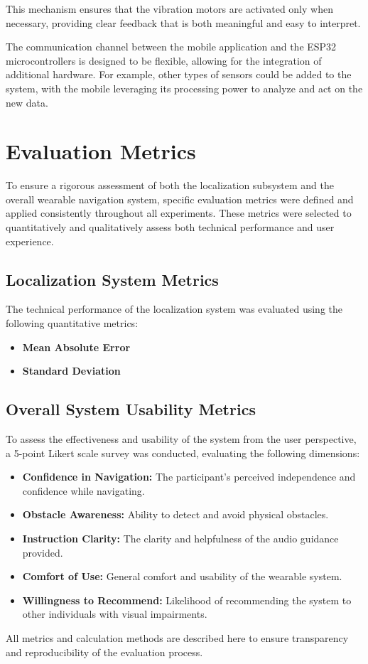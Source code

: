 This mechanism ensures that the vibration motors are activated only when necessary, providing clear feedback that is both meaningful and easy to interpret.

The communication channel between the mobile application and the ESP32 microcontrollers is designed to be flexible, allowing for the integration of additional hardware. For example, other types of sensors could be added to the system, with the mobile leveraging its processing power to analyze and act on the new data.

\section{Evaluation Metrics}
\label{sec:evaluation_metrics}

To ensure a rigorous assessment of both the localization subsystem and the overall wearable navigation system, specific evaluation metrics were defined and applied consistently throughout all experiments. These metrics were selected to quantitatively and qualitatively assess both technical performance and user experience.

\subsection{Localization System Metrics}
The technical performance of the localization system was evaluated using the following quantitative metrics:
\begin{itemize}
	\item \textbf{Mean Absolute Error} 
	\item \textbf{Standard Deviation} 
\end{itemize}

\subsection{Overall System Usability Metrics}
To assess the effectiveness and usability of the system from the user perspective, a 5-point Likert scale survey was conducted, evaluating the following dimensions:
\begin{itemize}
	\item \textbf{Confidence in Navigation:} The participant’s perceived independence and confidence while navigating.
	\item \textbf{Obstacle Awareness:} Ability to detect and avoid physical obstacles.
	\item \textbf{Instruction Clarity:} The clarity and helpfulness of the audio guidance provided.
	\item \textbf{Comfort of Use:} General comfort and usability of the wearable system.
	\item \textbf{Willingness to Recommend:} Likelihood of recommending the system to other individuals with visual impairments.
\end{itemize}

All metrics and calculation methods are described here to ensure transparency and reproducibility of the evaluation process.

